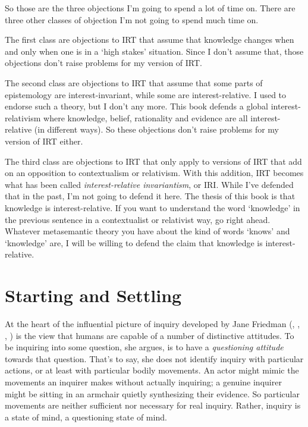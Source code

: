 \documentclass[
  12pt,
  letterpaper,
]{scrbook}
\begin{document}
So those are the three objections I'm going to spend a lot of time on.
There are three other classes of objection I'm not going to spend much
time on.

The first class are objections to IRT that assume that knowledge changes
when and only when one is in a `high stakes' situation. Since I don't
assume that, those objections don't raise problems for my version of
IRT.

The second class are objections to IRT that assume that some parts of
epistemology are interest-invariant, while some are interest-relative. I
used to endorse such a theory, but I don't any more. This book defends a
global interest-relativism where knowledge, belief, rationality and
evidence are all interest-relative (in different ways). So these
objections don't raise problems for my version of IRT either.

The third class are objections to IRT that only apply to versions of IRT
that add on an opposition to contextualism or relativism. With this
addition, IRT becomes what has been called \emph{interest-relative
invariantism}, or IRI. While I've defended that in the past, I'm not
going to defend it here. The thesis of this book is that knowledge is
interest-relative. If you want to understand the word `knowledge' in the
previous sentence in a contextualist or relativist way, go right ahead.
Whatever metasemantic theory you have about the kind of words `knows'
and `knowledge' are, I will be willing to defend the claim that
knowledge is interest-relative.

\section{Starting and Settling}\label{sec-settling}

At the heart of the influential picture of inquiry developed by Jane
Friedman (,
,
, )
is the view that humans are capable of a number of distinctive
attitudes. To be inquiring into some question, she argues, is to have a
\emph{questioning attitude} towards that question. That's to say, she
does not identify inquiry with particular actions, or at least with
particular bodily movements. An actor might mimic the movements an
inquirer makes without actually inquiring; a genuine inquirer might be
sitting in an armchair quietly synthesizing their evidence. So
particular movements are neither sufficient nor necessary for real
inquiry. Rather, inquiry is a state of mind, a questioning state of
mind.
\end{document}
